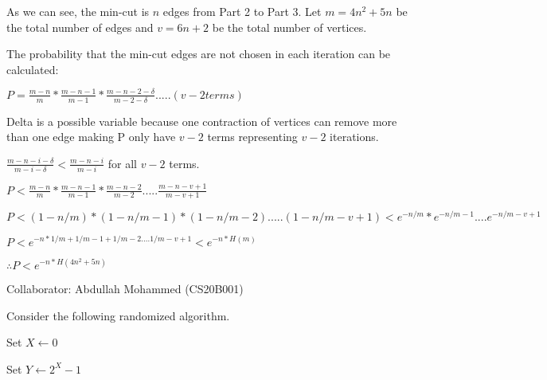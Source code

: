 \documentclass[addpoints,12pt]{exam}
\newcommand{\E}{\mathbb{E}}
\begin{document}
\begin{questions}
\begin{solution}
            As we can see, the min-cut is $n$ edges from Part 2 to Part 3. Let $m = 4n^2 + 5n$ be the total number of edges and $v = 6n+2$ be the total number of vertices.

            The probability that the min-cut edges are not chosen in each iteration can be calculated:
            
             $P = \frac{m-n}{m} * \frac{m-n-1}{m-1} * \frac{m-n-2-\delta}{m-2-\delta} .....(v-2 terms) $
             
             Delta is a possible variable because one contraction of vertices can remove more than one edge making P only have $v-2$ terms representing $v-2$ iterations.

             $\frac{m-n-i-\delta}{m-i-\delta} < \frac{m-n-i}{m-i}$ for all $v-2$ terms.

             $P < \frac{m-n}{m} * \frac{m-n-1}{m-1} * \frac{m-n-2}{m-2} .....\frac{m-n-v+1}{m-v+1}$
             
             $P < (1-n/m) * (1-n/{m-1}) * (1-n/{m-2}) .....(1-n/{m-v+1}) < e^{-n/m}*e^{-n/{m-1}} .... e^{-n/{m-v+1}}$
             
             $P < e^{-n*{1/m + 1/{m-1} + 1/{m-2} .... 1/{m-v+1}}} < e^{-n*H(m)}$

             $\therefore P < e^{-n*H(4n^2 + 5n)}$

             Collaborator: Abdullah Mohammed (CS20B001)

            
            
          \end{solution}
          
          \question Consider the following randomized algorithm.
          
          \begin{algorithm}[H]

            Set $X \gets 0$


            Set $Y \gets 2^X - 1$
            \caption{}
          \end{algorithm}

\end{questions}
\end{document}

